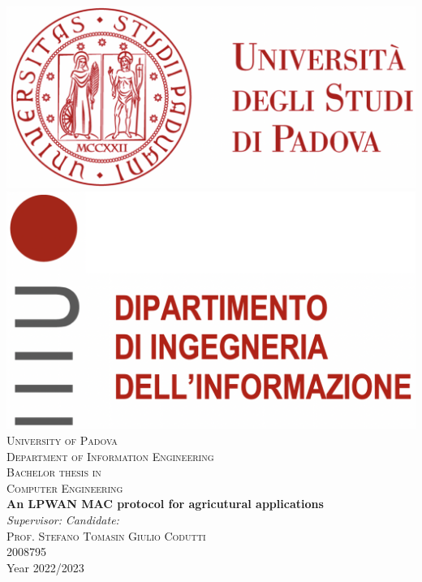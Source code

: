 







\begin{titlepage}
    \begin{center}
        \includegraphics[scale=0.25]{images/logo_unipd.png} \hfill
        \includegraphics[scale=0.25]{images/logo_dei.png}\\
        \vspace{1.0cm}
        \textsc{\LARGE University of Padova}\\
        \vspace{0.45cm}
        \textsc{\large Department of Information Engineering}\\
        \vspace{0.4cm}
        \textsc{\large Bachelor thesis in }\\
        \textsc{\large Computer Engineering}\\
        \vfill
        { \LARGE \bfseries An LPWAN MAC protocol for agricutural applications
        }\\
        \vfill
        \textit{\large Supervisor:} \hfill \textit{\large Candidate:}\\
        \textsc{\large Prof. Stefano Tomasin} \hfill \textsc{Giulio Codutti}\\
        \hfill \textsc{2008795}\\

        \vfill
        {\large Year 2022/2023}
    \end{center}
\end{titlepage}


